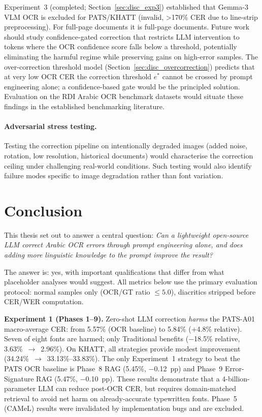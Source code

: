 Experiment~3 (completed; Section~\ref{sec:disc_exp3}) established that
Gemma-3 VLM OCR is excluded for PATS/KHATT (invalid, >170\% CER due to line-strip preprocessing). For full-page documents it is
full-page documents. Future work should study confidence-gated correction
that restricts LLM intervention to tokens where the OCR confidence score
falls below a threshold, potentially eliminating the harmful regime
while preserving gains on high-error samples. The over-correction threshold
model (Section~\ref{sec:disc_overcorrection}) predicts that at very low OCR
CER the correction threshold $e^*$ cannot be crossed by prompt engineering
alone; a confidence-based gate would be the principled solution. Evaluation
on the RDI Arabic OCR benchmark datasets would situate these findings in the
established benchmarking literature.

\paragraph{Adversarial stress testing.}
Testing the correction pipeline on intentionally degraded images (added noise,
rotation, low resolution, historical documents) would characterise the
correction ceiling under challenging real-world conditions. Such testing
would also identify failure modes specific to image degradation rather than
font variation.

\section{Conclusion}
\label{sec:conclusion}

This thesis set out to answer a central question: \emph{Can a lightweight
open-source LLM correct Arabic OCR errors through prompt engineering alone,
and does adding more linguistic knowledge to the prompt improve the result?}

The answer is: yes, with important qualifications that differ from what
placeholder analyses would suggest. All metrics below use the primary
evaluation protocol: normal samples only (OCR/GT ratio $\leq 5.0$),
diacritics stripped before CER/WER computation.

\textbf{Experiment 1 (Phases 1--9).} Zero-shot LLM correction \emph{harms}
the PATS-A01 macro-average CER: from 5.57\% (OCR baseline) to 5.84\% ($+$4.8\%
relative). Seven of eight fonts are harmed; only Traditional benefits
($-$18.5\% relative, 3.63\%~$\to$~2.96\%). On KHATT, all strategies provide
modest improvement (34.24\%~$\to$~33.13\%--33.83\%). The only Experiment~1
strategy to beat the PATS OCR baseline is Phase~8 RAG (5.45\%, $-$0.12~pp)
and Phase~9 Error-Signature RAG (5.47\%, $-$0.10~pp). These results demonstrate
that a 4-billion-parameter LLM can reduce post-OCR CER, but requires
domain-matched retrieval to avoid net harm on already-accurate typewritten
fonts. Phase~5 (CAMeL) results were invalidated by implementation bugs and
are excluded.

